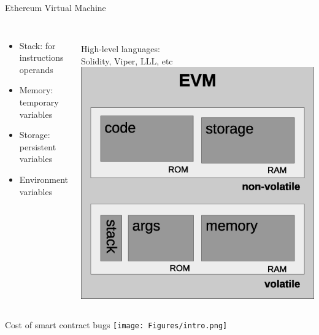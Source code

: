 \documentclass{beamer}
\begin{document}
\begin{frame}{Ethereum Virtual Machine}
	\begin{columns}[c]
		\begin{itemize}
			\item Stack: for instructions operands
			\item Memory: temporary variables
			\item Storage: persistent variables
			\item Environment variables
		\end{itemize}
		~\\
		High-level languages:\\
		Solidity, Viper, LLL, etc
		\includegraphics[scale=0.3]{Figures/evm.eps}
	\end{columns}
\end{frame}

\begin{frame}{Cost of smart contract bugs}
	\texttt{[image: Figures/intro.png]}
\end{frame}
\end{document}
